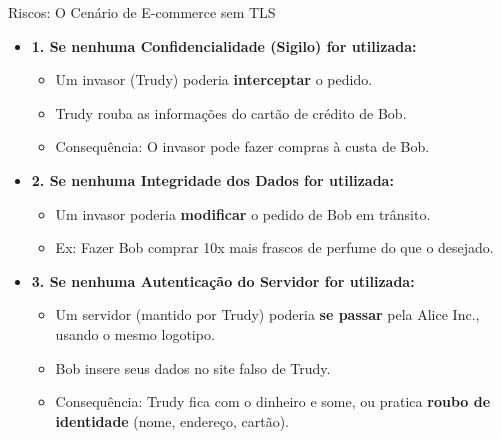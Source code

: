 \begin{frame}{Riscos: O Cenário de E-commerce sem TLS}
    \begin{itemize}
        \item \textbf{1. Se nenhuma Confidencialidade (Sigilo) for utilizada:}
              \begin{itemize}
                  \item Um invasor (Trudy) poderia \textbf{interceptar} o pedido.
                  \item Trudy rouba as informações do cartão de crédito de Bob.
                  \item Consequência: O invasor pode fazer compras à custa de Bob.
              \end{itemize}

        \item \textbf{2. Se nenhuma Integridade dos Dados for utilizada:}
              \begin{itemize}
                  \item Um invasor poderia \textbf{modificar} o pedido de Bob em trânsito.
                  \item Ex: Fazer Bob comprar 10x mais frascos de perfume do que o desejado.
              \end{itemize}

        \item \textbf{3. Se nenhuma Autenticação do Servidor for utilizada:}
              \begin{itemize}
                  \item Um servidor (mantido por Trudy) poderia \textbf{se passar} pela Alice Inc., usando o mesmo logotipo.
                  \item Bob insere seus dados no site falso de Trudy.
                  \item Consequência: Trudy fica com o dinheiro e some, ou pratica \textbf{roubo de identidade} (nome, endereço, cartão).
              \end{itemize}
    \end{itemize}
\end{frame}

